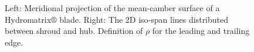 \begin{figure}[h!]
\begin{minipage}[b]{0.5\linewidth}
 \centering
\end{minipage}
\begin{minipage}[b]{0.5\linewidth}
 \centering
\end{minipage}
\caption{Left: Meridional projection of the mean-camber surface of a Hydromatrix$\circledR$ blade. Right: The 2D iso-span lines distributed between shroud and hub. Definition of $\rho$ for the leading and trailing edge.}
\label{param1}
\end{figure}
 

